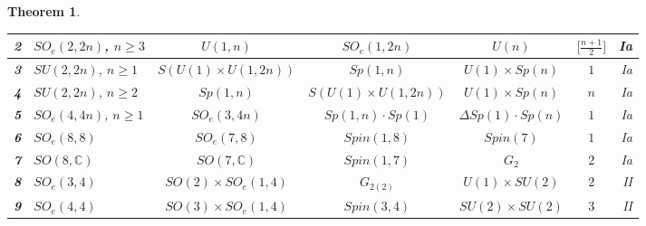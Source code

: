 \documentclass[10]{amsart}
\newtheorem{thm}{Theorem}[section]
\theoremstyle{remark}
\theoremstyle{definition}
\numberwithin{equation}{section}
\begin{document}
{\begin{thm}
\begin{table}[h]
\begin{center}
{\begin{tabular}{|r||l||c||c||c||c||r|}
   \hline
    \hline
    \bf 2&$SO_e(2,2n)$, $n\ge 3$ & $U(1,n)$ & $SO_e(1,2n)$ & $U(n)$ & $\lbrack\frac{n+1}{2}\rbrack$ & Ia \\
   \hline
    \hline
 \bf 3 &$SU(2,2n)$, $n\ge 1$  & $S(U(1)\times U(1,2n))$ & $Sp(1,n)$ & $U(1)\times Sp(n)$ & $1$ & Ia \\
   \hline
    \hline
    \bf 4& $SU(2,2n)$, $n\ge 2$& $Sp(1,n)$ & $S(U(1)\times U(1,2n))$ & $U(1)\times Sp(n)$ & $n$ & Ia \\
  \hline
    \hline
    \bf 5& $SO_e(4,4n)$, $n\ge 1$ & $SO_e(3,4n)$ & $Sp(1,n)\cdot Sp(1)$ & $\Delta Sp(1)\cdot Sp(n)$ & $1$ & Ia \\ 
\hline
    \hline
  \bf 6    & $SO_e(8,8)$& $SO_e(7,8)$ & $Spin(1,8)$ & $Spin(7)$ & $1$ & Ia \\
   \hline
    \hline
    \bf 7    & $SO(8,{\mathbb C})$& $SO(7,{\mathbb C})$ & $Spin(1,7)$ & $G_2$ & $2$ & Ia \\
     \hline
    \hline
    \bf 8      & $SO_e(3,4)$& $SO(2)\times SO_e(1,4)$ & $G_{2(2)}$ & $U(1)\times SU(2)$& $2$ & II \\   
 \hline
    \hline
     \bf 9   & $SO_e(4,4)$& $SO(3)\times SO_e(1,4)$ & $Spin(3,4)$ &$SU(2)\times SU(2)$ & $3$ & II \\
   

\end{tabular}}
\end{center}
\end{table}
\end{thm}}
\end{document}
